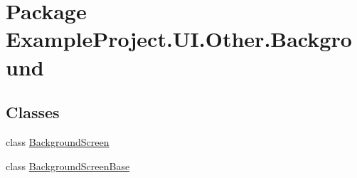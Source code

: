 \hypertarget{namespace_example_project_1_1_u_i_1_1_other_1_1_background}{}\section{Package Example\+Project.\+U\+I.\+Other.\+Background}
\label{namespace_example_project_1_1_u_i_1_1_other_1_1_background}
\subsection*{Classes}
\begin{DoxyCompactItemize}
\item 
class \hyperlink{class_example_project_1_1_u_i_1_1_other_1_1_background_1_1_background_screen}{Background\+Screen}
\item 
class \hyperlink{class_example_project_1_1_u_i_1_1_other_1_1_background_1_1_background_screen_base}{Background\+Screen\+Base}
\end{DoxyCompactItemize}
